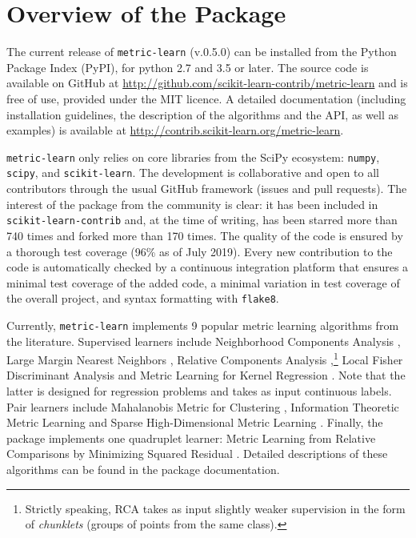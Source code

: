 \documentclass[twoside,11pt]{article}
\begin{document}
\section{Overview of the Package}

The current release of \texttt{metric-learn} (v.0.5.0) can be installed from the Python Package Index (PyPI), for python 2.7 and 3.5 or later. The source code is available on GitHub at \url{http://github.com/scikit-learn-contrib/metric-learn} and is free of use, provided under the MIT licence. A detailed documentation (including installation guidelines, the description of the algorithms and the API, as well as examples) is available at \url{http://contrib.scikit-learn.org/metric-learn}.


\texttt{metric-learn} only relies on core libraries from the SciPy ecosystem: \texttt{numpy}, \texttt{scipy}, and \texttt{scikit-learn}. The development is collaborative and open to all contributors through the usual GitHub framework (issues and pull requests). The interest of the package from the community is clear: it has been included in \texttt{scikit-learn-contrib} and, at the time of writing, has been starred more than 740 times and forked more than 170 times.
The quality of the code is ensured by a thorough test coverage (96\% as of July 2019). Every new contribution to the code is automatically checked by a continuous integration platform that ensures a minimal test coverage of the added code, a minimal variation in test coverage of the overall project, and syntax formatting with \texttt{flake8}. %

Currently, \texttt{metric-learn} implements 9 popular metric learning algorithms from the literature. Supervised learners include Neighborhood Components Analysis \citep[NCA,][]{Goldberger04}, Large Margin Nearest Neighbors \citep[LMNN,][]{Weinberger09}, Relative Components Analysis \citep[RCA,][]{Shental02},\footnote{Strictly speaking, RCA takes as input slightly weaker supervision in the form of \emph{chunklets} (groups of points from the same class).} Local Fisher Discriminant Analysis \citep[LFDA,][]{Sugiyama07} and Metric Learning for Kernel Regression \citep[MLKR,][]{Weinberger07}. Note that the latter is designed for regression problems and takes as input continuous labels. Pair learners include Mahalanobis Metric for Clustering \citep[MMC,][]{Xing2002a}, Information Theoretic Metric Learning \citep[ITML,][]{Davis07} and Sparse High-Dimensional Metric Learning \citep[SDML,][]{Qi09}. Finally, the package implements one quadruplet learner: Metric Learning from Relative Comparisons by Minimizing Squared Residual \citep[LSML,][]{Liu12}. Detailed descriptions of these algorithms can be found in the package documentation.
\end{document}
